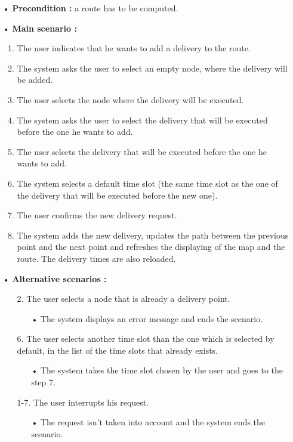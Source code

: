 \documentclass[paper=a4,fontsize=11pt]{report}
\numberwithin{equation}{section}		%
\numberwithin{figure}{section}		%
\numberwithin{table}{section}		%
\begin{document}
\begin{itemize}
  \item[•] \textbf{Precondition :} a route has to be computed.
  \item[•] \textbf{Main scenario :}
  \begin{enumerate}
    \item The user indicates that he wants to add a delivery to the route.
    \item The system asks the user to select an empty node, where the delivery will be added.
    \item The user selects the node where the delivery will be executed.
    \item The system asks the user to select the delivery that will be executed before the one he wants to add.
    \item The user selects the delivery that will be executed before the one he wants to add.
    \item The system selects a default time slot (the same time slot as the one of the delivery that will be executed before the new one).
    \item The user confirms the new delivery request.
    \item The system adds the new delivery, updates the path between the previous point and the next point and refreshes the displaying of the map and the route. The delivery times are also reloaded.
  \end{enumerate}
  \item[•] \textbf{Alternative scenarios :}
  \begin{itemize}
    \item[2.] The user selects a node that is already a delivery point.
    \begin{itemize}
      \item[•] The system displays an error message and ends the scenario.
    \end{itemize}
    \item[6.] The user selects another time slot than the one which is selected by default, in the list of the time slots that already exists.
    \begin{itemize}
      \item[•] The system takes the time slot chosen by the user and goes to the step 7.
    \end{itemize}
    \item[1-7.] The user interrupts his request.
    \begin{itemize}
      \item[•] The request isn’t taken into account and the system ends the scenario.
    \end{itemize}
  \end{itemize}
\end{itemize}
\end{document}
